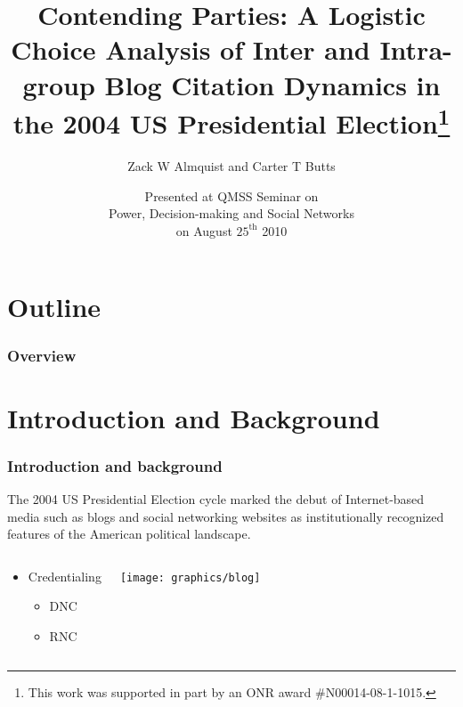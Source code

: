 \documentclass{beamer}
\title{Contending Parties: A Logistic Choice Analysis of Inter and Intra-group Blog Citation Dynamics in the 2004 US Presidential Election\thanks{\tiny{This work was supported in part by an ONR award \#N00014-08-1-1015.}}}
\author{Zack W Almquist  and Carter T Butts}
\date[03/09/2010]{Presented at QMSS Seminar on \\ Power, Decision-making and Social Networks \\ on August $25^{\textrm{th}}$ 2010}
\institute{Department of Sociology \\ University of California, Irvine}
\begin{document}
\begin{frame}
\titlepage
\end{frame}


\section*{Outline}
\begin{frame}
\frametitle{Overview}
  \tableofcontents
\end{frame}



\section{Introduction and Background}

\begin{frame}
\frametitle{Introduction and background}

\begin{block}{}
The 2004 US Presidential Election cycle marked the debut of Internet-based media such as blogs and social networking websites as institutionally recognized features of the American political landscape.
\end{block}

\begin{columns}

\begin{block}{}
\begin{itemize}
\item Credentialing
\begin{itemize}
\item DNC
\item RNC
\end{itemize}
\end{itemize}

\end{block}


\begin{block}{}
\texttt{[image: graphics/blog]}
\end{block}

\end{columns}

\end{frame}
\end{document}
